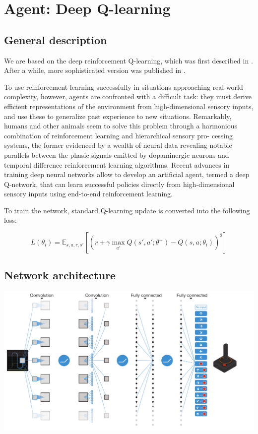 \documentclass{article}
\begin{document}
\section{Agent: Deep Q-learning}

\subsection{General description} 

We are based on the deep reinforcement
Q-learning, which was first described in \cite{mnih2013playing}.
After a while, more sophisticated version was published in 
\cite{mnih2015humanlevel}.

 To use reinforcement learning successfully in situations
approaching real-world complexity, however, agents are confronted
with a difficult task: they must derive efficient representations of the
environment from high-dimensional sensory inputs, and use these
to generalize past experience to new situations. Remarkably, humans
and other animals seem to solve this problem through a harmonious
combination of reinforcement learning and hierarchical sensory pro-
cessing systems, the former evidenced by a wealth of neural data
revealing notable parallels between the phasic signals emitted by 
dopaminergic neurons and temporal difference reinforcement learning
algorithms. Recent advances in training deep neural networks allow to
develop an artificial agent, termed a deep Q-network, that can
learn successful policies directly from high-dimensional sensory inputs
using end-to-end reinforcement learning. 

To train the network, standard Q-learning update is converted into the
following loss:

$$L(\theta_i) = \mathbb{E}_{s,a,r,s'} \left[ \left(r + \gamma \max_{a'}Q(s', a'; \theta^{-}) - Q(s, a; \theta_i) \right)^2 \right] $$

\subsection{Network architecture}

\includegraphics[scale=0.3]{dqn_crop.png}
\end{document}
